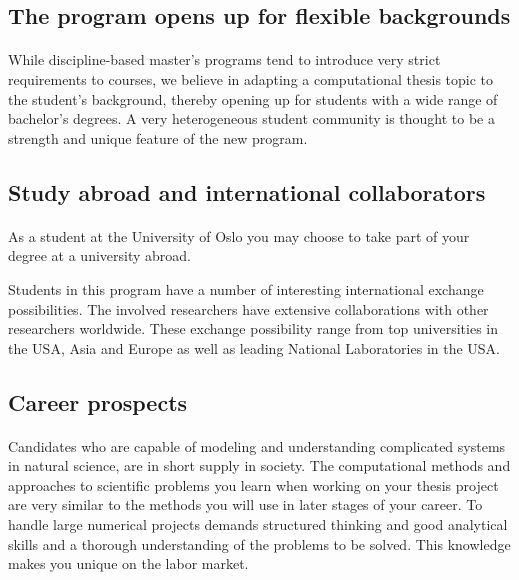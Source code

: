 \documentclass[%
twoside,                 %
final,                   %
10pt]{article}
\begin{document}
\noindent



\subsection*{The program opens up for flexible backgrounds}


\paragraph{}
While discipline-based master's programs tend to introduce very strict
requirements to courses, we believe in adapting a computational thesis
topic to the student's background, thereby opening up for
students with a wide range of bachelor's degrees.
A very heterogeneous student community is thought to be a strength and
unique feature of the new program.



\subsection*{Study abroad and international collaborators}


\paragraph{}

As a student at the University of Oslo you may choose to take part of
your degree at a university abroad.

Students in this program have a number of interesting international
exchange possibilities. The involved researchers have extensive
collaborations with other researchers worldwide. These exchange
possibility range from top universities in the USA, Asia and Europe as
well as leading National Laboratories in the USA.  



\subsection*{Career prospects}


\paragraph{}
Candidates who are capable of modeling and understanding complicated
systems in natural science, are in short supply in society.  The
computational methods and approaches to scientific problems you learn
when working on your thesis project are very similar to the methods
you will use in later stages of your career.  To handle large
numerical projects demands structured thinking and good analytical
skills and a thorough understanding of the problems to be solved. This
knowledge makes you unique on the labor market.
\end{document}

